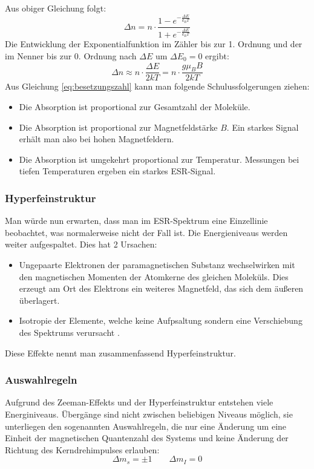 \documentclass[a4paper,titlepage]{scrartcl}
\numberwithin{equation}{section}
\begin{document}
Aus obiger Gleichung folgt:
\begin{equation*}
\Delta n=n \cdot \frac{1-e^{-\frac{\Delta E}{k_B T}}}{1+e^{-\frac{\Delta E}{k_B T}}}
\end{equation*}
Die Entwicklung der Exponentialfunktion im Zähler bis zur 1. Ordnung und der im Nenner bis zur 0. Ordnung nach $\Delta E$ um $\Delta E_0=0$ ergibt:
\begin{equation}
\label{eq:besetzungszahl}
\Delta n \approx n \cdot \frac{\Delta E}{2kT}=n \cdot \frac{g \mu_B B}{2 k T}
\end{equation}
Aus Gleichung \ref{eq:besetzungszahl} kann man folgende Schulussfolgerungen ziehen:
\begin{itemize}
\item Die Absorption ist proportional zur Gesamtzahl der Moleküle. 
\item Die Absorption ist proportional zur Magnetfeldstärke $B$. Ein starkes Signal erhält man also bei hohen Magnetfeldern.
\item Die Absorption ist umgekehrt proportional zur Temperatur. Messungen bei tiefen Temperaturen ergeben ein starkes ESR-Signal.
\end{itemize}
\subsubsection{Hyperfeinstruktur}
Man würde nun erwarten, dass man im ESR-Spektrum eine Einzellinie beobachtet, was normalerweise nicht der Fall ist. Die Energieniveaus werden weiter aufgespaltet. Dies hat 2 Ursachen:
\begin{itemize}
\item Ungepaarte Elektronen der paramagnetischen Substanz wechselwirken mit den magnetischen Momenten der Atomkerne des gleichen Moleküls. Dies erzeugt am Ort des Elektrons ein weiteres Magnetfeld, das sich dem äußeren überlagert.
\item Isotropie der Elemente, welche keine Aufpsaltung sondern eine Verschiebung des Spektrums verursacht \cite{wiki:hyperfeinstruktur}.
\end{itemize}
Diese Effekte nennt man zusammenfassend Hyperfeinstruktur.
\subsubsection{Auswahlregeln}
Aufgrund des Zeeman-Effekts und der Hyperfeinstruktur entstehen viele Energiniveaus. Übergänge sind nicht zwischen beliebigen Niveaus möglich, sie unterliegen den sogenannten Auswahlregeln, die nur eine Änderung um eine Einheit der magnetischen Quantenzahl des Systems und keine Änderung der Richtung des Kerndrehimpulses erlauben:
\begin{equation*}
\Delta m_s=\pm 1 \quad \quad \Delta m_I=0
\end{equation*}
\end{document}
